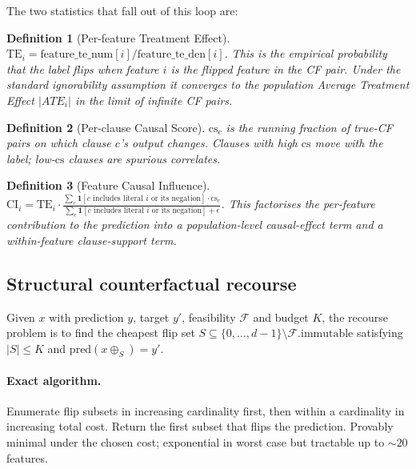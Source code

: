 \documentclass[11pt]{article}
\newtheorem{definition}{Definition}
\begin{document}
The two statistics that fall out of this loop are:

\begin{definition}[Per-feature Treatment Effect]
\label{def:te}
$\mathrm{TE}_i = \mathrm{feature\_te\_num}[i] / \mathrm{feature\_te\_den}[i]$.  This is the empirical probability that the label flips when feature $i$ is the flipped feature in the CF pair.  Under the standard ignorability assumption it converges to the population Average Treatment Effect $|ATE_i|$ in the limit of infinite CF pairs.
\end{definition}

\begin{definition}[Per-clause Causal Score]
\label{def:cs}
$\mathrm{cs}_c$ is the running fraction of true-CF pairs on which clause $c$'s output changes.  Clauses with high $\mathrm{cs}$ move with the label; low-$\mathrm{cs}$ clauses are spurious correlates.
\end{definition}

\begin{definition}[Feature Causal Influence]
$\mathrm{CI}_i = \mathrm{TE}_i \cdot \frac{\sum_c \mathbf{1}[c \text{ includes literal } i \text{ or its negation}] \cdot \mathrm{cs}_c}{\sum_c \mathbf{1}[c \text{ includes literal } i \text{ or its negation}] + \epsilon}$.  This factorises the per-feature contribution to the prediction into a population-level causal-effect term and a within-feature clause-support term.
\end{definition}

\subsection{Structural counterfactual recourse}

Given $x$ with prediction $y$, target $y'$, feasibility $\mathcal{F}$ and budget $K$, the recourse problem is to find the cheapest flip set $S \subseteq \{0, \ldots, d-1\} \setminus \mathcal{F}.\text{immutable}$ satisfying $|S| \leq K$ and $\mathrm{pred}(x \oplus_S) = y'$.

\paragraph{Exact algorithm.}  Enumerate flip subsets in increasing cardinality first, then within a cardinality in increasing total cost.  Return the first subset that flips the prediction.  Provably minimal under the chosen cost; exponential in worst case but tractable up to $\sim$$20$ features.
\end{document}

